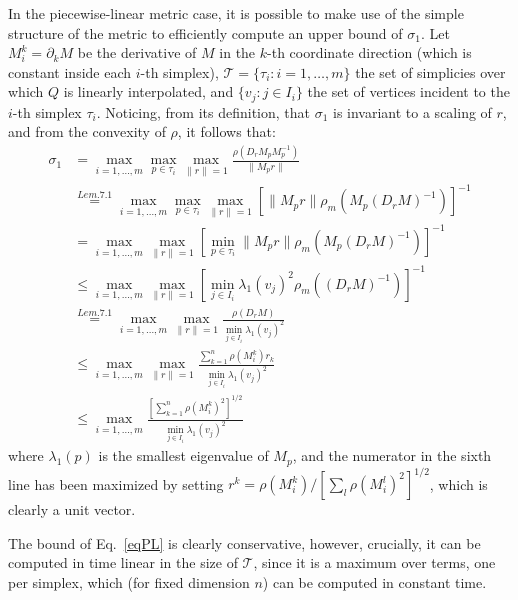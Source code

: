 \documentclass[11pt]{article}
\newcommand{\s}{\sigma}
\newcommand{\T}{\mathcal{T}}
\begin{document}
In the piecewise-linear metric case, it is possible to make use of the simple structure of the metric to efficiently compute an upper bound of $\s_1$. 
Let $M^k_i = \partial_k M$ be the derivative of $M$ in the $k$-th coordinate direction (which is constant inside each $i$-th simplex), 
	$\T=\{\tau_i : i=1,\dots,m\}$ the set of simplicies over which $Q$ is linearly interpolated, 
	and $\{v_j : j\in I_i\}$ the set of vertices incident to the $i$-th simplex $\tau_i$.
Noticing, from its definition, that $\s_1$ is invariant to a scaling of $r$,  and from the convexity of $\rho$, it follows that:
\begin{equation}\label{eqPL}
\begin{split}
	\s_1 &= \displaystyle{ \max_{i=1,\dots,m}  \max_{p\in{\tau_i}}  \max_{\|r\|=1} \frac{\rho(D_r M_p M_p^{-1})}{ \|M_p r\| }  } \\
	&\overset{Lem. 7.1}{= }  \displaystyle{ \max_{i=1,\dots,m}  \max_{p\in{\tau_i}}  \max_{\|r\|=1}   \left[ \|M_p r\| \rho_m(M_p (D_r M)^{-1}) \right]^{-1} } \\ 
	&{= }   \displaystyle{ \max_{i=1,\dots,m}     \max_{\|r\|=1}  \left[ \min_{p\in{\tau_i}} \|M_p r\| \rho_m(M_p (D_r M)^{-1}) \right]^{-1} } \\ 
	&\le  \displaystyle{ \max_{i=1,\dots,m}     \max_{\|r\|=1}  \left[   \min_{j\in I_i} \lambda_1(v_j)^2 \rho_m( (D_r M)^{-1} ) \right]^{-1} } \\
	&\overset{Lem. 7.1}{=}  \displaystyle{ \max_{i=1,\dots,m}     \max_{\|r\|=1}  \frac{ \rho(D_r M) }{    \min_{j\in I_i} \lambda_1(v_j)^2 }  } \\
	&\le   \displaystyle{ \max_{i=1,\dots,m}     \max_{\|r\|=1}  \frac{    \sum_{k=1}^n   \rho(  M_i^k ) r_k  }{    \min_{j\in I_i} \lambda_1(v_j)^2 }  } \\
	&\le \displaystyle{ \max_{i=1,\dots,m}    \frac{ \left[   \sum_{k=1}^n   \rho(  M_i^k )^2 \right]^{1/2}  }{    \min_{j\in I_i} \lambda_1(v_j)^2 }  }
\end{split}
\end{equation}
where $\lambda_1(p)$ is the smallest eigenvalue of $M_p$, and the numerator in the sixth line has been maximized by setting
$ r^k =  \rho\left(   M_i^k  \right)  / \left[  \sum_l \rho\left( M_i^l   \right)^2 \right]^{1/2}$, which is clearly a unit vector. 



The bound of Eq.~\ref{eqPL} is clearly conservative, however, crucially, it can be computed in time linear in the size of $\T$, since it is a maximum over terms, one per simplex, 
	which (for fixed dimension $n$) can be computed in constant time. 
\end{document}
